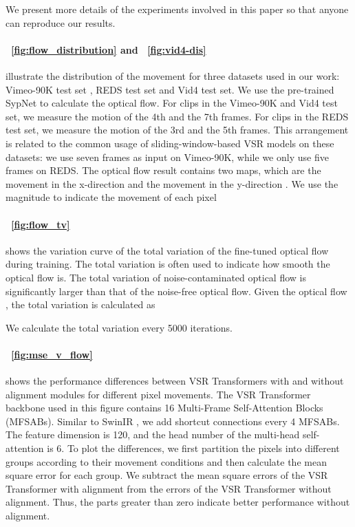 \documentclass{article}
\begin{document}
We present more details of the experiments involved in this paper so that anyone can reproduce our results.

\vspace{-3mm}
\paragraph{\figurename~\ref{fig:flow_distribution} and \figurename~\ref{fig:vid4-dis}}
illustrate the distribution of the movement for three datasets used in our work: Vimeo-90K test set \cite{xue2019video}, REDS \cite{nah2019ntire} test set and Vid4 \cite{liu2013bayesian} test set.
We use the pre-trained SypNet \cite{ranjan2017optical} to calculate the optical flow.
For clips in the Vimeo-90K and Vid4 test set, we measure the motion of the 4th and the 7th frames.
For clips in the REDS test set, we measure the motion of the 3rd and the 5th frames.
This arrangement is related to the common usage of sliding-window-based VSR models on these datasets: we use seven frames as input on Vimeo-90K, while we only use five frames on REDS.
The optical flow result contains two maps, which are the movement in the x-direction  and the movement in the y-direction .
We use the magnitude to indicate the movement of each pixel


\vspace{-3mm}
\paragraph{\figurename~\ref{fig:flow_tv}}
shows the variation curve of the total variation of the fine-tuned optical flow during training.
The total variation is often used to indicate how smooth the optical flow is.
The total variation of noise-contaminated optical flow is significantly larger than that of the noise-free optical flow.
Given the optical flow , the total variation is calculated as

We calculate the total variation every 5000 iterations.

\vspace{-3mm}
\paragraph{\figurename~\ref{fig:mse_v_flow}}
shows the performance differences between VSR Transformers with and without alignment modules for different pixel movements.
The VSR Transformer backbone used in this figure contains 16 Multi-Frame Self-Attention Blocks (MFSABs).
Similar to SwinIR \cite{liang2021swinir}, we add shortcut connections every 4 MFSABs.
The feature dimension is 120, and the head number of the multi-head self-attention is 6.
To plot the differences, we first partition the pixels into different groups according to their movement conditions and then calculate the mean square error for each group.
We subtract the mean square errors of the VSR Transformer with alignment from the errors of the VSR Transformer without alignment.
Thus, the parts greater than zero indicate better performance without alignment.
\end{document}
